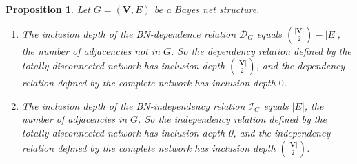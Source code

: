 \documentclass{elsarticle}%
\newtheorem{corollary}[theorem]{Corollary}
\newtheorem{proposition}[theorem]{Proposition}
\newcommand{\V}{\mathbf{V}}
\newcommand{\D}{\mathcal{D}}
\newcommand{\I}{\mathcal{I}}
\begin{document}
\begin{proposition}
\label{cor:number-edges}Let $G = (\V,E)$ be a Bayes net structure. 
\begin{enumerate}
\item 
The inclusion depth of the BN-dependence relation
$\D_{G}$ equals ${\binom{|\mathbf{V}|}{2}} - |E|$, the number of adjacencies {\em not} in $G$.
So the dependency relation defined by the totally
disconnected network has inclusion depth ${\binom{|\mathbf{V}|}{2}}$, and the dependency relation defined by the complete network has
inclusion depth $0$.  \label{depth-dependency}
\item \label{depth-independency} The inclusion depth of the BN-independency relation
$\I_{G}$ equals $|E|$, the number of adjacencies in $G$.
So the independency relation defined by the totally
disconnected network has inclusion depth 0, and the independency relation defined by the complete network has inclusion depth ${\binom{|\mathbf{V}|}{2}}$.
\end{enumerate}
\end{proposition}
\end{document}
